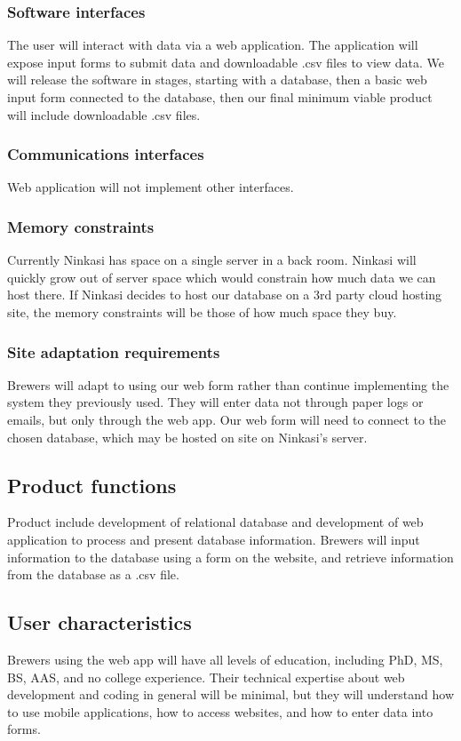 \documentclass[draftclsnofoot,onecolumn,letterpaper,10pt,compsoc]{IEEEtran}
\begin{document}
		\subsubsection{Software interfaces}
			The user will interact with data via a web application.
			The application will expose input forms to submit data and downloadable .csv files to view data.
			We will release the software in stages, starting with a database, then a basic web input form connected to the database, then our final minimum viable product will include downloadable .csv files.

		\subsubsection{Communications interfaces}
			Web application will not implement other interfaces.

		\subsubsection{Memory constraints}
			Currently Ninkasi has space on a single server in a back room.
			Ninkasi will quickly grow out of server space which would constrain how much data we can host there.
			If Ninkasi decides to host our database on a 3rd party cloud hosting site, the memory constraints will be those of how much space they buy.

		\subsubsection{Site adaptation requirements}
			Brewers will adapt to using our web form rather than continue implementing the system they previously used.
			They will enter data not through paper logs or emails, but only through the web app.
			Our web form will need to connect to the chosen database, which may be hosted on site on Ninkasi’s server.

	\subsection{Product functions}
		Product include development of relational database and development of web application to process and present database information.
		Brewers will input information to the database using a form on the website, and retrieve information from the database as a .csv file.

	\subsection{User characteristics}
		Brewers using the web app will have all levels of education, including PhD, MS, BS, AAS, and no college experience.
		Their technical expertise about web development and coding in general will be minimal, but they will understand how to use mobile applications, how to access websites, and how to enter data into forms.
\end{document}

